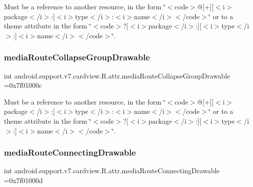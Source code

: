 Must be a reference to another resource, in the form \char`\"{}$<$code$>$@\mbox{[}+\mbox{]}\mbox{[}$<$i$>$package$<$/i$>$\+:\mbox{]}$<$i$>$type$<$/i$>$\+:$<$i$>$name$<$/i$>$$<$/code$>$\char`\"{} or to a theme attribute in the form \char`\"{}$<$code$>$?\mbox{[}$<$i$>$package$<$/i$>$\+:\mbox{]}\mbox{[}$<$i$>$type$<$/i$>$\+:\mbox{]}$<$i$>$name$<$/i$>$$<$/code$>$\char`\"{}. \mbox{\label{classandroid_1_1support_1_1v7_1_1cardview_1_1R_1_1attr_a885fad46466663babb5eafdd7fcd364b}} 
\subsubsection{\texorpdfstring{media\+Route\+Collapse\+Group\+Drawable}{mediaRouteCollapseGroupDrawable}}
{\footnotesize\ttfamily int android.\+support.\+v7.\+cardview.\+R.\+attr.\+media\+Route\+Collapse\+Group\+Drawable =0x7f01000c\hspace{0.3cm}{\ttfamily [static]}}

Must be a reference to another resource, in the form \char`\"{}$<$code$>$@\mbox{[}+\mbox{]}\mbox{[}$<$i$>$package$<$/i$>$\+:\mbox{]}$<$i$>$type$<$/i$>$\+:$<$i$>$name$<$/i$>$$<$/code$>$\char`\"{} or to a theme attribute in the form \char`\"{}$<$code$>$?\mbox{[}$<$i$>$package$<$/i$>$\+:\mbox{]}\mbox{[}$<$i$>$type$<$/i$>$\+:\mbox{]}$<$i$>$name$<$/i$>$$<$/code$>$\char`\"{}. \mbox{\label{classandroid_1_1support_1_1v7_1_1cardview_1_1R_1_1attr_a1553a474801f2e15d036bead87f5d93d}} 
\subsubsection{\texorpdfstring{media\+Route\+Connecting\+Drawable}{mediaRouteConnectingDrawable}}
{\footnotesize\ttfamily int android.\+support.\+v7.\+cardview.\+R.\+attr.\+media\+Route\+Connecting\+Drawable =0x7f01000d\hspace{0.3cm}{\ttfamily [static]}}

